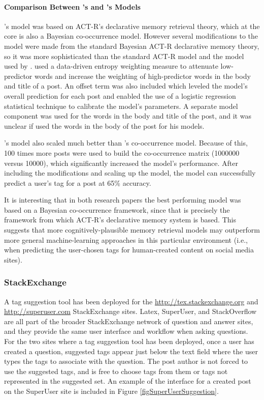 \documentclass[man,floatsintext,donotrepeattitle]{apa6}
\begin{document}
\paragraph{Comparison Between \citeauthor{Kuo2011}'s and \citeauthor{Stanley2013}'s Models}

\textcite{Stanley2013}'s model was based on ACT-R's declarative memory retrieval theory, which at the core is also a Bayesian co-occurrence model.
However several modifications to the model were made from the standard Bayesian ACT-R declarative memory theory, so it was more sophisticated than the standard ACT-R model and the model used by \textcite{Kuo2011}.
\citeauthor{Stanley2013} used a data-driven entropy weighting measure to attenuate low-predictor words and increase the weighting of high-predictor words in the body and title of a post.
An offset term was also included which leveled the model's overall prediction for each post and enabled the use of a logistic regression statistical technique to calibrate the model's parameters.
A separate model component was used for the words in the body and title of the post, and it was unclear if \citeauthor{Kuo2011} used the words in the body of the post for his models.

\citeauthor{Stanley2013}'s model also scaled much better than \citeauthor{Kuo2011}'s co-occurrence model. 
Because of this, 100 times more posts were used to build the co-occurrence matrix (\num{1000000} versus \num{10000}), which significantly increased the model's performance.
After including the modifications and scaling up the model, the model can successfully predict a user's tag for a post at 65\% accuracy.

It is interesting that in both research papers the best performing model was based on a Bayesian co-occurrence framework, since that is precisely the framework from which ACT-R's declarative memory system is based.
This suggests that more cognitively-plausible memory retrieval models may outperform more general machine-learning approaches in this particular environment
(i.e., when predicting the user-chosen tags for human-created content on social media sites).

\subsubsection{StackExchange}

A tag suggestion tool has been deployed for the \url{http://tex.stackexchange.org} \parencite{LatexTags2013} and \url{http://superuser.com} \parencite{SuperUserTags2013} StackExchange sites.
Latex, SuperUser, and StackOverflow are all part of the broader StackExchange network of question and answer sites, and they provide the same user interface and workflow when asking questions.
For the two sites where a tag suggestion tool has been deployed, once a user has created a question, suggested tags appear just below the text field where the user types the tags to associate with the question.
The post author is not forced to use the suggested tags, and is free to choose tags from them or tags not represented in the suggested set.
An example of the interface for a created post on the SuperUser site is included in Figure \ref{figSuperUserSuggestion}.
\end{document}
